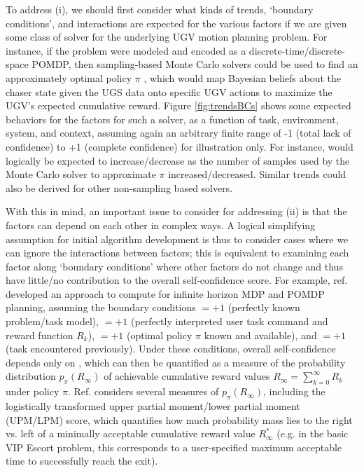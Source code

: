 To address (i), we should first consider what kinds of trends, `boundary conditions', and interactions are expected for the various factors if we are given some class of solver for the underlying UGV motion planning problem. For instance, if the problem were modeled and encoded as a discrete-time/discrete-space POMDP, then sampling-based Monte Carlo solvers could be used to find an approximately optimal policy $\pi$ \cite{Silver-NIPS-2010, Thrun-ProbRobotics-2006}, which would map Bayesian beliefs about the chaser state given the UGS data onto specific UGV actions to maximize the UGV's expected cumulative reward. Figure \ref{fig:trendsBCs} shows some expected behaviors for the \famsec{} factors for such a solver, as a function of task, environment, system, and context, assuming again an arbitrary finite range of -1 (total lack of confidence) to +1 (complete confidence) for illustration only. For instance, \xQ{} would logically be expected to increase/decrease as the number of samples used by the Monte Carlo solver to approximate $\pi$ increased/decreased. Similar trends could also be derived for other non-sampling based solvers. 

With this in mind, an important issue to consider for addressing (ii) is that the factors can depend on each other in complex ways. A logical simplifying assumption for initial algorithm development is thus to consider cases where we can ignore the interactions between factors; this is equivalent to examining each factor along `boundary conditions' where other factors do not change and thus have little/no contribution to the overall self-confidence score. For example, ref. \cite{Aitken2016-cv} developed an approach to compute \xO{} for infinite horizon MDP and POMDP planning, assuming the boundary conditions \xM$=+1$ (perfectly known problem/task model), \xI $= +1$ (perfectly interpreted user task command and reward function $R_k$), \xQ$=+1$ (optimal policy $\pi$ known and available), and \xP$=+1$ (task encountered previously). Under these conditions, overall self-confidence depends only on \xO, which can then be quantified as a measure of the probability distribution $p_{\pi}(R_{\infty})$ of achievable cumulative reward values $R_{\infty} = \sum_{k=0}^{\infty}R_{k}$ under policy $\pi$. Ref. \cite{Aitken2016-cv} considers several measures of $p_{\pi}(R_{\infty})$, including the logistically transformed upper partial moment/lower partial moment (UPM/LPM) score, which quantifies how much probability mass lies to the right vs. left of a minimally acceptable cumulative reward value $R^*_{\infty}$ (e.g. in the basic VIP Escort problem, this corresponds to a user-specified maximum acceptable time to successfully reach the exit).

